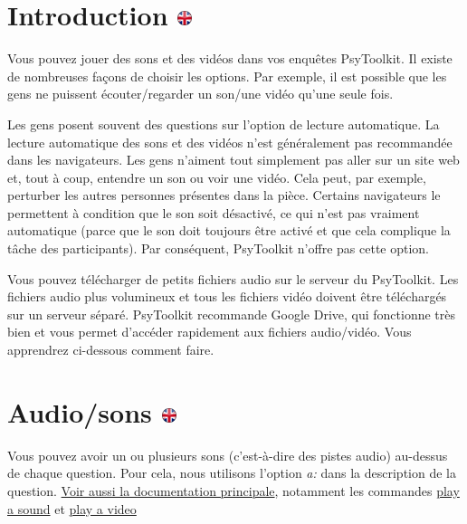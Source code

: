\documentclass[
]{book}
\begin{document}
\hypertarget{introduction-1}{%
\section[Introduction ]{\texorpdfstring{Introduction \href{https://www.psytoolkit.org/lessons/surveyaudiovideo.html\#_introduction}{\protect\includegraphics{img/ukflag.png}}}{Introduction }}\label{introduction-1}}

Vous pouvez jouer des sons et des vidéos dans vos enquêtes PsyToolkit. Il existe de nombreuses façons de choisir les options. Par exemple, il est possible que les gens ne puissent écouter/regarder un son/une vidéo qu'une seule fois.

Les gens posent souvent des questions sur l'option de lecture automatique. La lecture automatique des sons et des vidéos n'est généralement pas recommandée dans les navigateurs. Les gens n'aiment tout simplement pas aller sur un site web et, tout à coup, entendre un son ou voir une vidéo. Cela peut, par exemple, perturber les autres personnes présentes dans la pièce. Certains navigateurs le permettent à condition que le son soit désactivé, ce qui n'est pas vraiment automatique (parce que le son doit toujours être activé et que cela complique la tâche des participants). Par conséquent, PsyToolkit n'offre pas cette option.

Vous pouvez télécharger de petits fichiers audio sur le serveur du PsyToolkit. Les fichiers audio plus volumineux et tous les fichiers vidéo doivent être téléchargés sur un serveur séparé. PsyToolkit recommande Google Drive, qui fonctionne très bien et vous permet d'accéder rapidement aux fichiers audio/vidéo. Vous apprendrez ci-dessous comment faire.

\hypertarget{audiosons}{%
\section[Audio/sons ]{\texorpdfstring{Audio/sons \href{https://www.psytoolkit.org/lessons/surveyaudiovideo.html\#_audio_sound}{\protect\includegraphics{img/ukflag.png}}}{Audio/sons }}\label{audiosons}}

Vous pouvez avoir un ou plusieurs sons (c'est-à-dire des pistes audio) au-dessus de chaque question. Pour cela, nous utilisons l'option \emph{a:} dans la description de la question. \protect\hyperlink{s8}{Voir aussi la documentation principale}, notamment les commandes \protect\hyperlink{playasound}{play a sound} et \protect\hyperlink{playavideo}{play a video}
\end{document}
